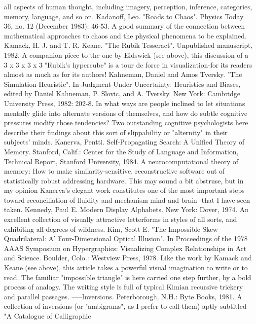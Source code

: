   all aspects of human thought, including imagery, perception, inference, categories, memory,
  language, and so on.
Kadanoff, Leo. "Roads to Chaos". Physics Today 36, no. 12 (December 1983): 46-53. A good
  summary of the connection between mathematical approaches to chaos and the physical
  phenomena to be explained.
Kamack, H. J. and T. R. Keane. "The Rubik Tesseract". Unpublished manuscript, 1982. A
  companion piece to the one by Eidswick (see above), this discussion of a 3 x 3 x 3 x 3
  "Rubik's hypercube" is a tour de force in visualization-for its readers almost as much as for
  its authors!
Kahneman, Daniel and Amos Tversky. "The Simulation Heuristic". In Judgment Under
  Uncertainty: Heuristics and Biases, edited by Daniel Kahneman, P. Slovic, and A. Tversky.
  New York: Cambridge University Press, 1982: 202-8. In what ways are people inclined to
  let situations mentally glide into alternate versions of themselves, and how do subtle
  cognitive pressures modify those tendencies? Two outstanding cognitive psychologists here
  describe their findings about this sort of slippability or "alternity" in their subjects' minds.
Kanerva, Pentti. Self-Propagating Search: A Unified Theory of Memory. Stanford, Calif.:
  Center for the Study of Language and Information, Technical Report, Stanford
University, 1984. A neurocomputational theory of memory: How to make similarity-sensitive,
  reconstructive software out of statistically robust addressing hardware. This may sound a bit
  abstruse, but in my opinion Kanerva's elegant work constitutes one of the most important
  steps toward reconciliation of fluidity and mechanism-mind and brain -that I have seen
  taken.
Kennedy, Paul E. Modern Display Alphabets. New York: Dover, 1974. An excellent
  collection of visually attractive letterforms in styles of all sorts, and exhibiting all degrees of
  wildness.
Kim, Scott E. "The Impossible Skew Quadrilateral: A' Four-Dimensional Optical Illusion". In
  Proceedings of the 1978 AAAS Symposium on Hypergraphics: Visualizing Complex
  Relationships in Art and Science. Boulder, Colo.: Westview Press, 1978. Like the work by
  Kamack and Keane (see above), this article takes a powerful visual imagination to write or
  to read. The familiar "impossible triangle" is here carried one step further, by a bold process
  of analogy. The writing style is full of typical Kimian recursive trickery and parallel
  passages.
-----Inversions. Peterborough, N.H.: Byte Books, 1981. A collection of inversions (or
  "ambigrams", as I prefer to call them) aptly subtitled "A Catalogue of Calligraphic
